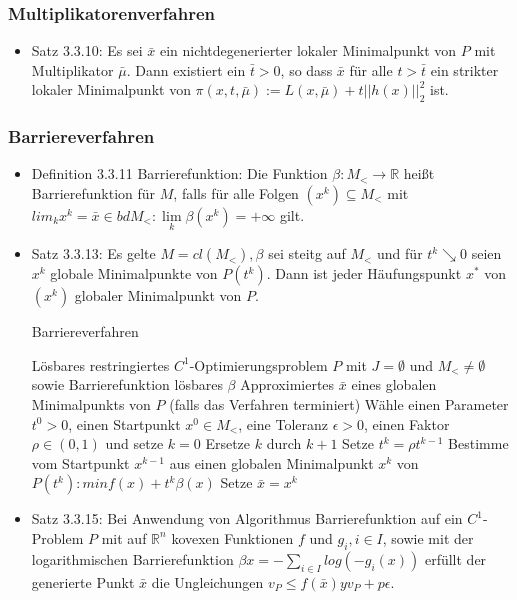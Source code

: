 \documentclass[paper=a4, fontsize=11pt]{scrartcl} %
\numberwithin{equation}{section} %
\numberwithin{figure}{section} %
\numberwithin{table}{section} %
\begin{document}
\subsubsection{Multiplikatorenverfahren}

\begin{itemize}
  \item Satz 3.3.10: Es sei $\bar{x}$ ein nichtdegenerierter lokaler Minimalpunkt von $P$ mit Multiplikator $\bar{\mu}$. Dann existiert ein $\bar{t} > 0$, so dass $\bar{x}$ für alle $t > \bar{t}$ ein strikter lokaler Minimalpunkt von $\pi(x,t,\bar{\mu}) := L(x,\bar{\mu}) + t||h(x)||^2_2$ ist.
\end{itemize}

\subsubsection{Barriereverfahren}

\begin{itemize}
  \item Definition 3.3.11 Barrierefunktion: Die Funktion $\beta: M_< \rightarrow \mathbb{R}$ heißt Barrierefunktion für $M$, falls für alle Folgen $(x^k) \subseteq M_<$ mit $lim_k x^k = \bar{x} \in bdM_<: \lim\limits_k \beta(x^k) = +\infty$ gilt.
  \item Satz 3.3.13: Es gelte $M = cl(M_<), \beta$ sei steitg auf $M_<$ und für $t^k \searrow 0$ seien $x^k$ globale Minimalpunkte von $P(t^k)$. Dann ist jeder Häufungspunkt $x^*$ von $(x^k)$ globaler Minimalpunkt von $P$.
  \begin{algorithm}
  \caption{Barriereverfahren}
  \begin{algorithmic}[1]
    \Require Lösbares restringiertes $C^1$-Optimierungsproblem $P$ mit $J = \emptyset$ und $M_< \neq \emptyset$ sowie Barrierefunktion lösbares $\beta$
    \Ensure Approximiertes $\bar{x}$ eines globalen Minimalpunkts von $P$ (falls das Verfahren terminiert)
    \State Wähle einen Parameter $t^0 > 0$, einen Startpunkt $x^0 \in M_<$, eine Toleranz $\epsilon > 0$, einen Faktor $\rho \in (0,1)$ und setze $k = 0$
    \Repeat
    \State Ersetze $k$ durch $k+1$
    \State Setze $t^k = \rho t^{k-1}$
    \State Bestimme vom Startpunkt $x^{k-1}$ aus einen globalen Minimalpunkt $x^k$ von $P(t^k): min f(x) + t^k \beta(x)$
    \State Setze $\bar{x} = x^k$
  \end{algorithmic}
  \end{algorithm}
  \item Satz 3.3.15: Bei Anwendung von Algorithmus Barrierefunktion auf ein $C^1$-Problem $P$ mit auf $\mathbb{R}^n$ kovexen Funktionen $f$ und $g_i, i \in I$, sowie mit der logarithmischen Barrierefunktion $\beta{x} = - \sum\limits_{i \in I} log(-g_i(x))$ erfüllt der generierte Punkt $\bar{x}$ die Ungleichungen $v_P \le f(\bar{x}) y v_P + p \epsilon$.
\end{itemize}
\end{document}
